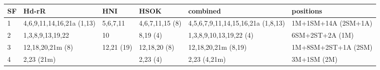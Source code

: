 \begin{tabular}{p{0.6cm}p{3.4cm}p{1.5cm}p{2cm}p{4.5cm}p{3.7cm}}
  \hline
  SF & Hd-rR & HNI & HSOK & combined & positions \\ \hline
  1 & 4,6,9,11,14,16,21a (1,13) & 5,6,7,11    & 4,6,7,11,15 (8) & 4,5,6,7,9,11,14,15,16,21a (1,8,13) & 1M+1SM+14A (2SM+1A) \\
  2 & 1,3,8,9,13,19,22          & 10          & 8,19 (4)        & 1,3,8,9,10,13,19,22 (4)            & 6SM+2ST+2A (1M) \\
  3 & 12,18,20,21m (8)          & 12,21 (19)  & 12,18,20 (8)    & 12,18,20,21m (8,19)                & 1M+8SM+2ST+1A (2SM) \\
  4 & 2,23 (21m)                &             & 2,23 (4)        & 2,23 (4,21m)                       & 3M+1SM (2M) \\
  \hline
\end{tabular}
